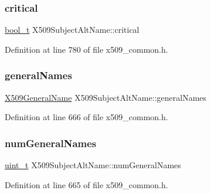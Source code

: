 \subsubsection{\texorpdfstring{critical}{critical}}
{\footnotesize\ttfamily \hyperlink{compiler__port_8h_a812d16e5494522586b3784e55d479912}{bool\+\_\+t} X509\+Subject\+Alt\+Name\+::critical}



Definition at line 780 of file x509\+\_\+common.\+h.

\mbox{\label{structX509SubjectAltName_ab4a56143bba771858700f363a8da4647}} 
\subsubsection{\texorpdfstring{general\+Names}{generalNames}}
{\footnotesize\ttfamily \hyperlink{structX509GeneralName}{X509\+General\+Name} X509\+Subject\+Alt\+Name\+::general\+Names}



Definition at line 666 of file x509\+\_\+common.\+h.

\mbox{\label{structX509SubjectAltName_a320072e6555af4e2bd76d9d154ef7eca}} 
\subsubsection{\texorpdfstring{num\+General\+Names}{numGeneralNames}}
{\footnotesize\ttfamily \hyperlink{compiler__port_8h_a12a1e9b3ce141648783a82445d02b58d}{uint\+\_\+t} X509\+Subject\+Alt\+Name\+::num\+General\+Names}



Definition at line 665 of file x509\+\_\+common.\+h.

\mbox{\label{structX509SubjectAltName_a7d756442bef6565af58ede9410b2dc77}} 
